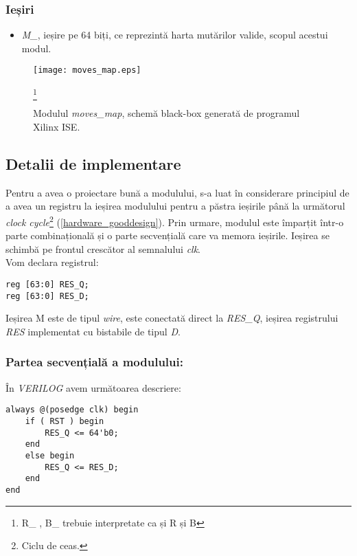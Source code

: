 \documentclass[12pt,twoside,a4paper,fleqn]{book}
\theoremstyle{definition}
\begin{document}
\subsubsection{Ieșiri}
\begin{itemize}
\item \emph{M\_}, ieșire pe 64 biți, ce reprezintă harta mutărilor valide, scopul acestui modul.
\end{itemize}

\begin{figure}[h]
\texttt{[image: moves\_map.eps]}
\caption{\small{Modulul \emph{moves\_map}, schemă black-box generată de programul Xilinx ISE.}}\footnote{R\_ , B\_ trebuie interpretate ca și R și B}
\label{fig:fig_movesmap}
\end{figure}

\subsection{Detalii de implementare}
Pentru a avea o proiectare bună a modulului, s-a luat în considerare principiul de a avea un registru la ieșirea modulului pentru a păstra ieșirile până la următorul \emph{clock cycle}\footnote{Ciclu de ceas.} (\ref{hardware_gooddesign}). Prin urmare, modulul este împarțit într-o parte combinațională și o parte secvențială care va memora ieșirile. Ieșirea se schimbă pe frontul crescător al semnalului \emph{clk}.\\
Vom declara registrul:
\begin{verbatim}
reg [63:0] RES_Q;
reg [63:0] RES_D;
\end{verbatim}
Ieșirea M este de tipul \emph{wire}, este conectată direct la \emph{RES\_Q}, ieșirea registrului \emph{RES} implementat cu bistabile de tipul \emph{D}.\\

\subsubsection{Partea secvențială a modulului:}
În \emph{VERILOG} avem următoarea descriere:
\begin{fragmentsursa}
\begin{verbatim}
always @(posedge clk) begin
    if ( RST ) begin
        RES_Q <= 64'b0;
    end
    else begin
        RES_Q <= RES_D;
    end
end
\end{verbatim}
\caption{Procesul sincron}
\end{fragmentsursa}
\end{document}
